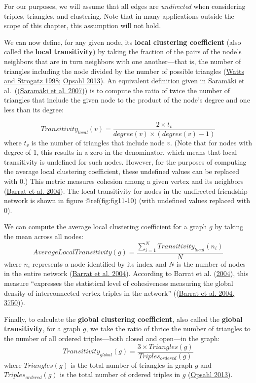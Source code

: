 \documentclass{book}
\begin{document}
For our purposes, we will assume that all edges are \emph{undirected} when
considering triples, triangles, and clustering. Note that in many applications
outside the scope of this chapter, this assumption will not hold.

We can now define, for any given node, its \textbf{local clustering
coefficient} (also called the \textbf{local transitivity}) by taking the
fraction of the pairs of the node's neighbors that are in turn neighbors with
one another---that is, the number of triangles including the node divided by
the number of possible triangles
(\protect\hyperlink{ref-WattsStrogatz1998}{Watts and Strogatz 1998};
\protect\hyperlink{ref-Opsahl2013}{Opsahl 2013}). An equivalent definition
given in Saramäki et al.~((\protect\hyperlink{ref-SaramakiEtAl2007}{Saramäki
et al. 2007})) is to compute the ratio of twice the number of triangles that
include the given node to the product of the node's degree and one less than
its degree:

\[Transitivity_{local}(v) = \frac{2 \times t_v}{degree(v) \times (degree(v) - 1)}\]
where \(t_v\) is the number of triangles that include node \(v\). (Note that
for nodes with degree of 1, this results in a zero in the denominator, which
means that local transitivity is undefined for such nodes. However, for the
purposes of computing the average local clustering coefficient, these
undefined values can be replaced with \(0\).) This metric measures cohesion
among a given vertex and its neighbors
(\protect\hyperlink{ref-BarratEtAl2004}{Barrat et al. 2004}). The local
transitivity for nodes in the undirected friendship network is shown in figure
@ref(fig:fig11-10) (with undefined values replaced with \(0\)).

We can compute the average local clustering coefficient for a graph \(g\) by
taking the mean across all nodes:
\[AverageLocalTransitivity(g) = \frac{\sum_{i = 1}^{N}Transitivity_{local}(n_i)}{N}\]
where \(n_i\) represents a node identified by its index and \(N\) is the
number of nodes in the entire network
(\protect\hyperlink{ref-BarratEtAl2004}{Barrat et al. 2004}). According to
Barrat et al. (\protect\hyperlink{ref-BarratEtAl2004}{2004}), this measure
``expresses the statistical level of cohesiveness measuring the global density
of interconnected vertex triples in the network''
((\protect\hyperlink{ref-BarratEtAl2004}{Barrat et al. 2004, 3750})).

Finally, to calculate the \textbf{global clustering coefficient}, also called
the \textbf{global transitivity}, for a graph \(g\), we take the ratio of
thrice the number of triangles to the number of all ordered triples---both
closed and open---in the graph:
\[Transitivity_{global}(g) = \frac{3 \times Triangles(g)}{Triples_{ordered}(g)}\]
where \(Triangles(g)\) is the total number of triangles in graph \(g\) and
\(Triples_{ordered}(g)\) is the total number of ordered triples in \(g\)
(\protect\hyperlink{ref-Opsahl2013}{Opsahl 2013}).
\end{document}
